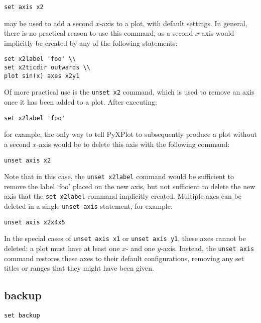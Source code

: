 \begin{verbatim}
set axis x2
\end{verbatim}

\noindent may be used to add a second $x$-axis to a plot, with default settings. In
general, there is no practical reason to use this command, as a second $x$-axis
would implicitly be created by any of the following statements:

\begin{verbatim}
set x2label 'foo' \\
set x2ticdir outwards \\
plot sin(x) axes x2y1
\end{verbatim}

Of more practical use is the {\tt unset x2} command, which is used to remove an
axis once it has been added to a plot. After executing:

\begin{verbatim}
set x2label 'foo'
\end{verbatim}

\noindent for example, the only way to tell PyXPlot to subsequently produce a plot
without a second $x$-axis would be to delete this axis with the following
command:

\begin{verbatim}
unset axis x2
\end{verbatim}

Note that in this case, the {\tt unset x2label} command would be sufficient to
remove the label `foo' placed on the new axis, but not sufficient to delete the
new axis that the {\tt set x2label} command implicitly created. Multiple axes
can be deleted in a single {\tt unset axis} statement, for example:

\begin{verbatim}
unset axis x2x4x5
\end{verbatim}

In the special cases of {\tt unset axis x1} or {\tt unset axis y1}, these axes
cannot be deleted; a plot must have at least one $x$- and one $y$-axis. Instead,
the {\tt unset axis} command restores these axes to their default
configurations, removing any set titles or ranges that they might have been
given.

\subsection{backup}

\begin{verbatim}
set backup
\end{verbatim}

